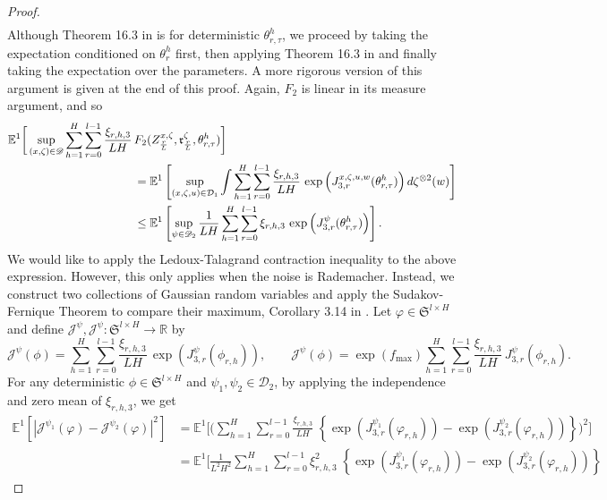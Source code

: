 \documentclass{article}
\newcommand{\R}{\mathbb{R}}
\newcommand{\E}{\mathbb{E}}
\begin{document}
\begin{appendices}
\begin{proof}
\begin{align}
    \end{align}
 Although Theorem 16.3 in \cite{vandeGeer2016} is for deterministic $\theta^h_{r,\tau}$, we proceed by taking the expectation conditioned on $\theta^h_r$ first, then applying Theorem 16.3 in \cite{vandeGeer2016} and finally taking the expectation over the parameters. A more rigorous version of this argument is given at the end of this proof. Again, $F_2$ is linear in its measure argument, and so
\begin{align}\label{eqn:J5}
     \mathbb E^1\bigg[\sup_{(x,\zeta)\in \mathscr D}\sum_{h=1}^H\sum_{r=0}^{l-1}\frac{\xi_{r,h,3}}{LH}\,& F_2(Z^{x,\zeta}_\frac{r}{L},\mathfrak{r}^{\zeta}_\frac{r}{L},\theta^h_{r,\tau})\bigg]\\&= \mathbb E^1\left[\sup_{(x,\zeta,u)\in \mathcal D_1}\int\sum_{h=1}^H\sum_{r=0}^{l-1}\frac{\xi_{r,h,3}}{LH}\, \exp\left( J_{3,r}^{x,\zeta,u,w}(\theta^h_{r,\tau})\right)d\zeta^{\otimes 2}(w)\right]
     \notag\\&\le \mathbb E^1\left[\sup_{\psi\in \mathscr D_2}\frac{1}{LH}\sum_{h=1}^H\sum_{r=0}^{l-1}\xi_{r,h,3}\, \exp\left( J_{3,r}^{\psi}(\theta^h_{r,\tau})\right)\right].\notag
\end{align}
We would like to apply the Ledoux-Talagrand contraction inequality to the above expression. However, this only applies when the noise is Rademacher. Instead, we construct two collections of Gaussian random variables and apply the Sudakov-Fernique Theorem to compare their maximum, Corollary 3.14 in \cite{Ledoux1991}. Let $\varphi\in\mathfrak{S}^{l\times H}$ and define $\mathcal J^\psi,\mathscr{J}^\psi:\mathfrak{S}^{l\times H}\to \R $ by
\[
\mathcal J^\psi(\phi) = \sum_{h=1}
^H\sum_{r=0}^{l-1}\frac{\xi_{r,h,3}}{LH}\, \exp\left( J^\psi_{3,r}(\phi_{r,h})\right), \qquad \mathscr J^\psi(\phi) = \exp(f_\mathrm{max})\sum_{h=1}
^H\sum_{r=0}^{l-1} \frac{\xi_{r,h,3}}{LH}\,  J^\psi_{3,r}(\phi_{r,h}). \]
For any deterministic $\phi\in \mathfrak{S}^{l\times H}$ and $\psi_1,\psi_2\in \mathscr D_2$, by applying the independence and zero mean of $\xi_{r,h,3}$, we get 
\begin{align*}
    \E^1[|\mathcal J^{\psi_1}(\varphi)- \mathcal J^{\psi_2}(\varphi)|^2]&=\mathbb E^1\Bigg[\bigg(\sum_{h=1}^H\sum_{r=0}^{l-1}\frac{\xi_{r,h,3}}{LH}\;\left\{ \exp\left( J^{\psi_1}_{3,r}(\varphi_{r,h})\right)- \exp\left( J^{\psi_2}_{3,r}(\varphi_{r,h})\right)\right\}
\bigg)^2\Bigg]\\ & = \mathbb E^1\Bigg[\frac{1}{L^2H^2}\sum_{h=1}^H\sum_{r=0}^{l-1}\xi^2_{r,h,3}\;\left\{ \exp\left( J^{\psi_1}_{3,r}(\varphi_{r,h})\right)- \exp\left(J^{\psi_2}_{3,r}(\varphi_{r,h})\right)\right\}

\end{align*}
\end{proof}
\end{appendices}
\end{document}
